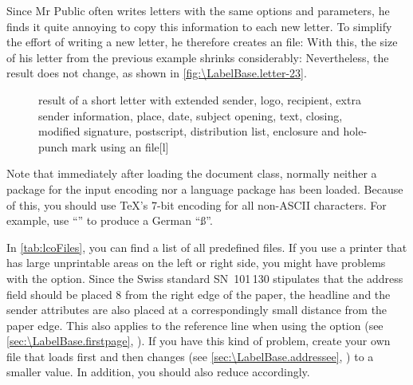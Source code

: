 \begin{Example}
  Since Mr Public often writes letters with the same options and parameters,
  he finds it quite annoying to copy this information to each new letter. To
  simplify the effort of writing a new letter, he therefore creates an
   file:%
  With this, the size of his letter from the previous example shrinks
  considerably: %
  Nevertheless, the result does not change, as shown in
  \autoref{fig:\LabelBase.letter-23}.
  \begin{figure}
    \setcapindent{0pt}%
    \begin{captionbeside}
      {result of a short letter with extended sender, logo, recipient,
        extra sender information, place, date, subject opening, text,
        closing, modified signature, postscript, distribution list, enclosure
        and hole-punch mark using an  file}[l]
    \end{captionbeside}
    \label{fig:\LabelBase.letter-23}
  \end{figure}
\end{Example}

Note that immediately after loading the document class,
normally neither a package for the input encoding nor a language package has
been loaded. Because of this, you should use \TeX's 7-bit encoding for all
non-ASCII characters. For example, use ``'' to produce a German
``\ss''.

In \autoref{tab:lcoFiles},  you can find a list of
all predefined  files. If you use a printer
that has large unprintable areas on the left or right side, you might have
problems with the  option. Since the Swiss standard
SN~101\,130 stipulates that the address field should be placed 8 from
the right edge of the paper, the headline and the sender attributes are also
placed at a correspondingly small distance from the paper edge. This also
applies to the reference line when using the
 option (see
\autoref{sec:\LabelBase.firstpage}, ).
If you have this kind of problem, create your own 
file that loads  first and then changes
 (see
\autoref{sec:\LabelBase.addressee},
) to a smaller value. In
addition, you should also reduce  accordingly.%

